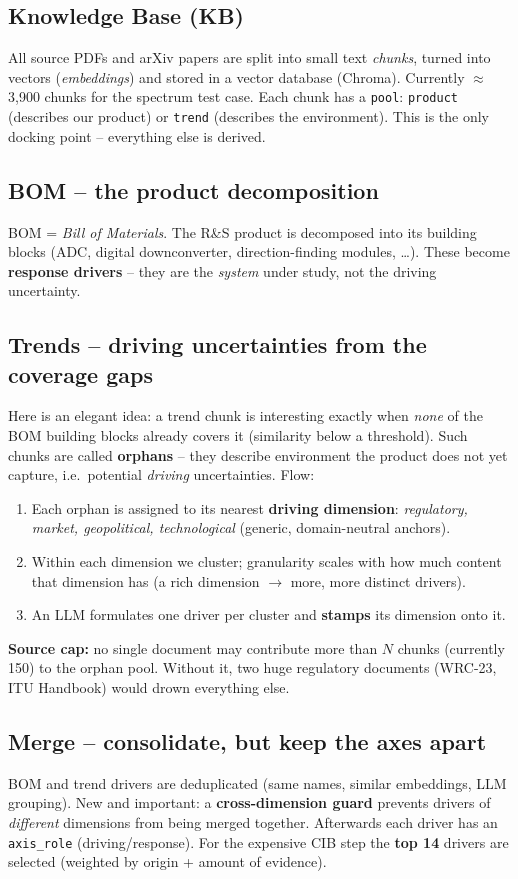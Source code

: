 \documentclass[11pt,a4paper]{article}
\newcommand{\code}[1]{\texttt{\small #1}}
\begin{document}
\subsection{Knowledge Base (KB)}
All source PDFs and arXiv papers are split into small text \emph{chunks}, turned into vectors
(\emph{embeddings}) and stored in a vector database (Chroma). Currently $\approx$3{,}900 chunks for the
spectrum test case. Each chunk has a \code{pool}: \code{product} (describes our product) or \code{trend}
(describes the environment). This is the only docking point -- everything else is derived.

\subsection{BOM -- the product decomposition}
BOM = \emph{Bill of Materials}. The R\&S product is decomposed into its building blocks (ADC, digital
downconverter, direction-finding modules, \dots). These become \textbf{response drivers} -- they are the
\emph{system} under study, not the driving uncertainty.

\subsection{Trends -- driving uncertainties from the coverage gaps}
Here is an elegant idea: a trend chunk is interesting exactly when \emph{none} of the BOM building blocks
already covers it (similarity below a threshold). Such chunks are called \textbf{orphans} -- they describe
environment the product does not yet capture, i.e.\ potential \emph{driving} uncertainties. Flow:
\begin{enumerate}
  \item Each orphan is assigned to its nearest \textbf{driving dimension}: \emph{regulatory, market,
  geopolitical, technological} (generic, domain-neutral anchors).
  \item Within each dimension we cluster; granularity scales with how much content that dimension has
  (a rich dimension $\to$ more, more distinct drivers).
  \item An LLM formulates one driver per cluster and \textbf{stamps} its dimension onto it.
\end{enumerate}
\textbf{Source cap:} no single document may contribute more than $N$ chunks (currently 150) to the orphan
pool. Without it, two huge regulatory documents (WRC-23, ITU Handbook) would drown everything else.

\subsection{Merge -- consolidate, but keep the axes apart}
BOM and trend drivers are deduplicated (same names, similar embeddings, LLM grouping). New and important:
a \textbf{cross-dimension guard} prevents drivers of \emph{different} dimensions from being merged
together. Afterwards each driver has an \code{axis\_role} (driving/response). For the expensive CIB step
the \textbf{top 14} drivers are selected (weighted by origin + amount of evidence).
\end{document}

